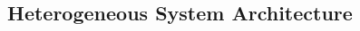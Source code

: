 \documentclass{beamer}
\begin{document}
\begin{CJK}{UTF8}{bkai}
            \subsection{Heterogeneous System Architecture}


\end{CJK}
\end{document}
